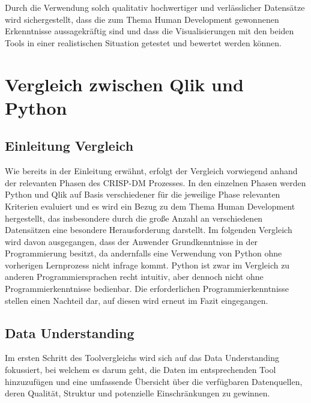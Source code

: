 \documentclass[12pt]{article}
\begin{document}
	Durch die Verwendung solch qualitativ hochwertiger und verlässlicher Datensätze wird sichergestellt, dass die zum Thema Human Development gewonnenen Erkenntnisse aussagekräftig sind und dass die Visualisierungen mit den beiden Tools in einer realistischen Situation getestet und bewertet werden können.
	\section{Vergleich zwischen Qlik und Python}
	
	\subsection{Einleitung Vergleich}
	Wie bereits in der Einleitung erwähnt, erfolgt der Vergleich vorwiegend anhand der relevanten Phasen des CRISP-DM Prozesses. In den einzelnen Phasen werden Python und Qlik auf Basis verschiedener für die jeweilige Phase relevanten Kriterien evaluiert und es wird ein Bezug zu dem Thema Human Development hergestellt, das insbesondere durch die große Anzahl an verschiedenen Datensätzen eine besondere Herausforderung darstellt. Im folgenden Vergleich wird davon ausgegangen, dass der Anwender Grundkenntnisse in der Programmierung besitzt, da andernfalls eine Verwendung von Python ohne vorherigen Lernprozess nicht infrage kommt. Python ist zwar im Vergleich zu anderen Programmiersprachen recht intuitiv, aber dennoch nicht ohne Programmierkenntnisse bedienbar. Die erforderlichen Programmierkenntnisse stellen einen Nachteil dar, auf diesen wird erneut im Fazit eingegangen.
	
	\subsection{Data Understanding}
	Im ersten Schritt des Toolvergleichs wird sich auf das Data Understanding fokussiert, bei welchem es darum geht, die Daten im entsprechenden Tool hinzuzufügen und eine umfassende Übersicht über die verfügbaren Datenquellen, deren Qualität, Struktur und potenzielle Einschränkungen zu gewinnen.
\end{document}
